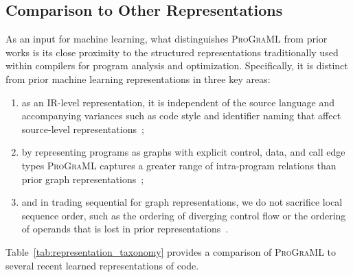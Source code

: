 \subsection{Comparison to Other Representations}

As an input for machine learning, what distinguishes \textsc{ProGraML}
from prior works is its close proximity to the structured
representations traditionally used within compilers for program
analysis and optimization. Specifically, it is distinct from prior
machine learning representations in three key areas:
\begin{enumerate}
\item as an IR-level representation, it is independent of the source
  language and accompanying variances such as code style and
  identifier naming that affect source-level
  representations~\cite{Alon2018a,Cummins2017a};
\item by representing programs as graphs with explicit control, data,
  and call edge types \textsc{ProGraML} captures a greater range of
  intra-program relations than prior graph
  representations~\cite{Ben-nun2018,Allamanis2017b,Park2012};
\item and in trading sequential for graph representations, we do not
  sacrifice local sequence order, such as the ordering of diverging
  control flow or the ordering of operands that is lost in prior
  representations~\cite{Ben-nun2018,Brauckmann2020}.
\end{enumerate}

Table~\ref{tab:representation_taxonomy} provides a comparison of
\textsc{ProGraML} to several recent learned representations of code.

